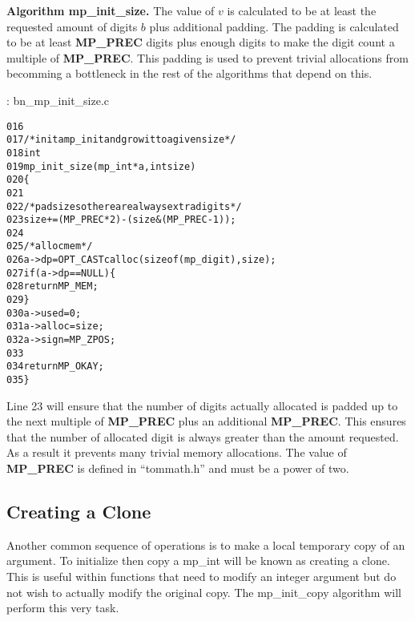 \documentclass[b5paper]{book}
\begin{document}
\textbf{Algorithm mp\_init\_size.}
The value of $v$ is calculated to be at least the requested amount of digits $b$ plus additional padding.  The padding is calculated
to be at least \textbf{MP\_PREC} digits plus enough digits to make the digit count a multiple of \textbf{MP\_PREC}.  This padding is used to 
prevent trivial allocations from becomming a bottleneck in the rest of the algorithms that depend on this.

\vspace{+3mm}\begin{small}
\hspace{-5.1mm}{\bf File}: bn\_mp\_init\_size.c
\vspace{-3mm}
\begin{alltt}
016   
017   /* init a mp_init and grow it to a given size */
018   int
019   mp_init_size (mp_int * a, int size)
020   \{
021   
022     /* pad size so there are always extra digits */
023     size += (MP_PREC * 2) - (size & (MP_PREC - 1));    
024     
025     /* alloc mem */
026     a->dp = OPT_CAST calloc (sizeof (mp_digit), size);
027     if (a->dp == NULL) \{
028       return MP_MEM;
029     \}
030     a->used = 0;
031     a->alloc = size;
032     a->sign = MP_ZPOS;
033   
034     return MP_OKAY;
035   \}
\end{alltt}
\end{small}

Line 23 will ensure that the number of digits actually allocated is padded up to the next multiple of 
\textbf{MP\_PREC} plus an additional \textbf{MP\_PREC}.  This ensures that the number of allocated digit is 
always greater than the amount requested.  As a result it prevents many trivial memory allocations.  The value of 
\textbf{MP\_PREC} is defined in ``tommath.h'' and must be a power of two.

\subsection{Creating a Clone}
Another common sequence of operations is to make a local temporary copy of an argument.  To initialize then copy a mp\_int will be known as 
creating a clone.  This is useful within functions that need to modify an integer argument but do not wish to actually modify the original copy.  
The mp\_init\_copy algorithm will perform this very task.
\end{document}
